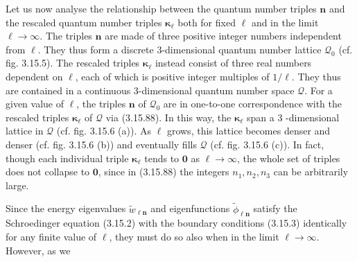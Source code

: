 \documentclass{article}
\begin{document}
Let us now analyse the relationship between the quantum number triples $\boldsymbol{n}$ and the rescaled quantum number triples $\boldsymbol{\kappa}_{\ell}$ both for fixed $\ell$ and in the limit $\ell \rightarrow \infty$. The triples $\boldsymbol{n}$ are made of three positive integer numbers independent from $\ell$. They thus form a discrete 3-dimensional quantum number lattice $\mathcal{Q}_{0}$ (cf. fig. 3.15.5). The rescaled triples $\boldsymbol{\kappa}_{\ell}$ instead consist of three real numbers dependent on $\ell$, each of which is positive integer multiples of $1 / \ell$. They thus are contained in a continuous 3-dimensional quantum number space $\mathcal{Q}$. For a given value of $\ell$, the triples $\boldsymbol{n}$ of $\mathcal{Q}_{0}$ are in one-to-one correspondence with the rescaled triples $\boldsymbol{\kappa}_{\ell}$ of $\mathcal{Q}$ via (3.15.88). In this way, the $\boldsymbol{\kappa}_{\ell}$ span a 3 -dimensional lattice in $\mathcal{Q}$ (cf. fig. 3.15.6 (a)). As $\ell$ grows, this lattice becomes denser and denser (cf. fig. 3.15.6 (b)) and eventually fills $\mathcal{Q}$ (cf. fig. 3.15.6 (c)). In fact, though each individual triple $\boldsymbol{\kappa}_{\ell}$ tends to $\mathbf{0}$ as $\ell \rightarrow \infty$, the whole set of triples does not collapse to $\mathbf{0}$, since in (3.15.88) the integers $n_{1}, n_{2}, n_{3}$ can be arbitrarily large.

Since the energy eigenvalues $\tilde{w}_{\ell \boldsymbol{n}}$ and eigenfunctions $\tilde{\phi}_{\ell \boldsymbol{n}}$ satisfy the Schroedinger equation (3.15.2) with the boundary conditions (3.15.3) identically for any finite value of $\ell$, they must do so also when in the limit $\ell \rightarrow \infty$. However, as we
\end{document}

